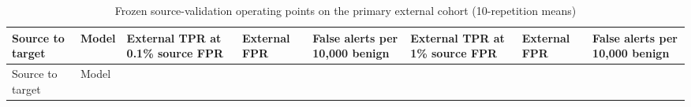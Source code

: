 \documentclass[
  10pt,
]{article}
\begin{document}
\begin{longtable}[]{@{}
  >{\raggedright\arraybackslash}p{}
  >{\raggedright\arraybackslash}p{}
  >{\raggedleft\arraybackslash}p{}
  >{\raggedleft\arraybackslash}p{}
  >{\raggedleft\arraybackslash}p{}
  >{\raggedleft\arraybackslash}p{}
  >{\raggedleft\arraybackslash}p{}
  >{\raggedleft\arraybackslash}p{}@{}}
\caption{Frozen source-validation operating points on the primary
external cohort (10-repetition means)}\tabularnewline
\toprule\noalign{}
\begin{minipage}[b]{\linewidth}\raggedright
Source to target
\end{minipage} & \begin{minipage}[b]{\linewidth}\raggedright
Model
\end{minipage} & \begin{minipage}[b]{\linewidth}\raggedleft
External TPR at 0.1\% source FPR
\end{minipage} & \begin{minipage}[b]{\linewidth}\raggedleft
External FPR
\end{minipage} & \begin{minipage}[b]{\linewidth}\raggedleft
False alerts per 10,000 benign
\end{minipage} & \begin{minipage}[b]{\linewidth}\raggedleft
External TPR at 1\% source FPR
\end{minipage} & \begin{minipage}[b]{\linewidth}\raggedleft
External FPR
\end{minipage} & \begin{minipage}[b]{\linewidth}\raggedleft
False alerts per 10,000 benign
\end{minipage} \\
\midrule\noalign{}
\endfirsthead
\toprule\noalign{}
\begin{minipage}[b]{\linewidth}\raggedright
Source to target
\end{minipage} & \begin{minipage}[b]{\linewidth}\raggedright
Model
\end{minipage} & \begin{minipage}[b]{\linewidth}\raggedleft

\end{minipage}
\end{longtable}
\end{document}
